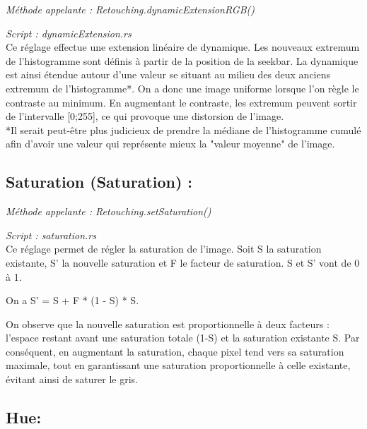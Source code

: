 \emph{Méthode appelante : Retouching.dynamicExtensionRGB()}

\emph{Script : dynamicExtension.rs}
\\

Ce réglage effectue une extension linéaire de dynamique. Les nouveaux extremum de l'histogramme sont définis à partir de la position de la seekbar.
La dynamique est ainsi étendue autour d'une valeur se situant au milieu des deux anciens extremum de l'histogramme*. On a donc une image uniforme lorsque
l'on règle le contraste au minimum. En augmentant le contraste, les extremum peuvent sortir de l'intervalle [0;255], ce qui provoque une distorsion de l'image.
\\

*Il serait peut-être plus judicieux de prendre la médiane de l'histogramme cumulé afin d'avoir une valeur qui représente mieux la "valeur moyenne" de l'image.


\subsection{Saturation (Saturation) :}

\emph{Méthode appelante : Retouching.setSaturation()}

\emph{Script : saturation.rs}
\\

Ce réglage permet de régler la saturation de l'image. Soit S la saturation existante, S' la nouvelle saturation et F le facteur de saturation. S et S' vont de 0 à 1.

On a S' = S + F * (1 - S) * S. 

On observe que la nouvelle saturation est proportionnelle à deux facteurs : l'espace restant avant une saturation totale (1-S) et la saturation existante S.
Par conséquent, en augmentant la saturation, chaque pixel tend vers sa saturation maximale, tout en garantissant une saturation proportionnelle à celle existante, évitant ainsi de saturer le gris.


\subsection{Hue:}

